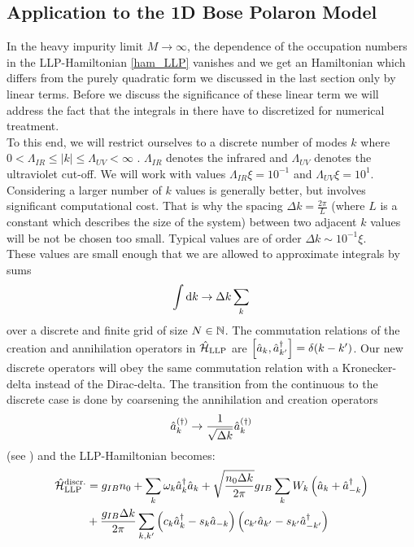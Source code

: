 \subsection{Application to the 1D Bose Polaron Model}
In the heavy impurity limit $M\rightarrow \infty$, the dependence of the occupation numbers in the LLP-Hamiltonian \ref{ham_LLP} vanishes and we get an Hamiltonian which differs from the purely quadratic form we discussed in the last section only by linear terms. Before we discuss the significance of these linear term we will address the fact that the integrals in there have to discretized for numerical treatment.\\
To this end, we will restrict ourselves to a discrete number of modes $k$ where $0<\Lambda_{IR}\leq |k|\leq\Lambda_{UV}<\infty$ . $\Lambda_{IR}$ denotes the infrared and $\Lambda_{UV}$ denotes the ultraviolet cut-off. We will work with values $\Lambda_{IR}\xi= 10^{-1}$ and $\Lambda_{UV}\xi= 10^1$. \\
Considering a larger number of $k$ values is generally better, but involves significant computational cost. That is why the spacing $\Delta k=\frac{2\pi}{L}$ (where $L$ is a constant which describes the size of the system) between two adjacent $k$ values will be not be chosen too small. Typical values are of order $\Delta k\sim 10^{-1}\xi$.  \\
These values are small enough that we are allowed to approximate integrals by sums
\begin{equation}
\int\mathrm d k\rightarrow \Delta k\sum\limits_k
\end{equation}
over a discrete and finite grid of size $N\in\mathbb{N}$.
The commutation relations of the creation and annihilation operators in $\hat{\mathcal{H}}_{\mathrm{LLP}}$ are $\left[\hat a_k,\hat a^\dagger_{k^\prime}\right]=\delta(k-k^\prime)$. Our new discrete operators will obey the same commutation relation with a Kronecker-delta instead of the Dirac-delta.
The transition from the continuous to the discrete case is done by coarsening the annihilation and creation operators
\begin{equation}
\hat a_k^{\left(\dagger\right)}\rightarrow \frac1{\sqrt{\Delta k}}\hat a_k^{\left(\dagger\right)}
\end{equation}
(see \cite[eq. (7)]{PracticalTraining})
and the LLP-Hamiltonian becomes:
\begin{align}\label{ham_LLP_discrete}
\hat{\mathcal{H}}_{\mathrm{LLP}}^{\mathrm{discr.}} &=g_{IB}n_0+\sum\limits_k \omega_{ k}\hat a^\dagger_{ k}\hat a_{ k}+\sqrt{\frac{n_0\Delta k}{2\pi}}g_{IB}\sum\limits_k W_k \left(\hat a_{ k}+\hat a^\dagger_{- k}\right) \\ &+ \frac{g_{IB}\Delta k}{2\pi}\sum\limits_{k,k^\prime} \left(c_k\hat a^\dagger_k-s_k\hat a_{-k}\right)\left(c_{k^\prime}\hat a_{k^\prime}-s_{k^\prime}\hat a^\dagger_{-k^\prime}\right)\nonumber
\end{align}
